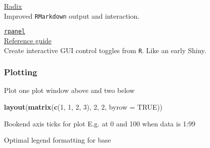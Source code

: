 \documentclass[10,portrait]{article}
\newenvironment{Shaded}{\begin{snugshade}}{\end{snugshade}}
\newcommand{\KeywordTok}[1]{\textcolor[rgb]{0.13,0.29,0.53}{\textbf{#1}}}
\newcommand{\DataTypeTok}[1]{\textcolor[rgb]{0.13,0.29,0.53}{#1}}
\newcommand{\DecValTok}[1]{\textcolor[rgb]{0.00,0.00,0.81}{#1}}
\newcommand{\StringTok}[1]{\textcolor[rgb]{0.31,0.60,0.02}{#1}}
\newcommand{\CommentTok}[1]{\textcolor[rgb]{0.56,0.35,0.01}{\textit{#1}}}
\newcommand{\OtherTok}[1]{\textcolor[rgb]{0.56,0.35,0.01}{#1}}
\newcommand{\OperatorTok}[1]{\textcolor[rgb]{0.81,0.36,0.00}{\textbf{#1}}}
\newcommand{\NormalTok}[1]{#1}
\begin{document}
\href{https://blog.rstudio.com/2018/09/19/radix-for-r-markdown/}{Radix}\\
Improved \texttt{RMarkdown} output and interaction.

\href{http://www.stats.gla.ac.uk/~adrian/rpanel/}{\texttt{rpanel}}\\
\href{https://cran.r-project.org/doc/Rnews/Rnews_2006-4.pdf}{Reference
guide}\\
Create interactive GUI control toggles from \texttt{R}. Like an early
Shiny.

\subsubsection{Plotting}\label{plotting}

Plot one plot window above and two below

\begin{Shaded}
\begin{Highlighting}[]
\KeywordTok{layout}\NormalTok{(}\KeywordTok{matrix}\NormalTok{(}\KeywordTok{c}\NormalTok{(}\DecValTok{1}\NormalTok{, }\DecValTok{1}\NormalTok{, }\DecValTok{2}\NormalTok{, }\DecValTok{3}\NormalTok{), }\DecValTok{2}\NormalTok{, }\DecValTok{2}\NormalTok{, }\DataTypeTok{byrow =} \OtherTok{TRUE}\NormalTok{))}
\end{Highlighting}
\end{Shaded}

Bookend axis ticks for plot E.g. at 0 and 100 when data is 1:99

\begin{Shaded}
\end{Shaded}

Optimal legend formatting for base
\end{document}
